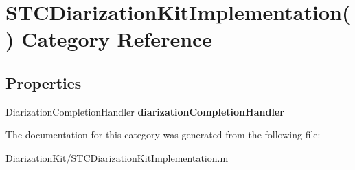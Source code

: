 \hypertarget{category_s_t_c_diarization_kit_implementation_07_08}{}\section{S\+T\+C\+Diarization\+Kit\+Implementation() Category Reference}
\label{category_s_t_c_diarization_kit_implementation_07_08}
\subsection*{Properties}
\begin{DoxyCompactItemize}
\item 
\hypertarget{category_s_t_c_diarization_kit_implementation_07_08_a1c933ed86974af36cbf3777186b1f6da}{}\label{category_s_t_c_diarization_kit_implementation_07_08_a1c933ed86974af36cbf3777186b1f6da} 
Diarization\+Completion\+Handler {\bfseries diarization\+Completion\+Handler}
\end{DoxyCompactItemize}


The documentation for this category was generated from the following file\+:\begin{DoxyCompactItemize}
\item 
Diarization\+Kit/S\+T\+C\+Diarization\+Kit\+Implementation.\+m\end{DoxyCompactItemize}
